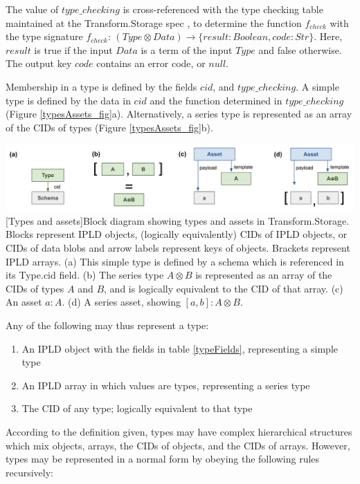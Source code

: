 \documentclass[9pt, oneside]{article}   	%
\begin{document}
The value of $type\_checking$ is cross-referenced with the type checking table maintained at the Transform.Storage spec \cite{transformSpec}, to determine the function $f_{check}$ with the type signature $f_{check}$: $(Type \otimes Data) \rightarrow \{result: Boolean, code: Str\}$. Here, $result$ is true if the input $Data$ is a term of the input $Type$ and false otherwise. The output key $code$ contains an error code, or $null$.

Membership in a type is defined by the fields $cid$, and $type\_checking$. A simple type is defined by the data in $cid$ and the function determined in $type\_checking$ (Figure \ref{typesAssets_fig}a). Alternatively, a series type is represented as an array of the CIDs of types (Figure \ref{typesAssets_fig}b). 


\begin{center}
\includegraphics[width=1\columnwidth]{fig_types_assets_20230802}
[Types and assets]{Block diagram showing types and assets in Transform.Storage. Blocks represent IPLD objects, (logically equivalently) CIDs of IPLD objects, or CIDs of data blobs and arrow labels represent keys of objects. Brackets represent IPLD arrays. (a) This simple type is defined by a schema which is referenced in its Type.cid field. (b) The series type $A \otimes B$ is represented as an array of the CIDs of types $A$ and $B$, and is logically equivalent to the CID of that array. (c) An asset $a : A$. (d) A series asset, showing $[a, b] : A \otimes B$.}
\label{typesAssets_fig}
\end{center}

Any of the following may thus represent a type:
\begin{enumerate}
\item An IPLD object with the fields in table \ref{typeFields}, representing a simple type
\item An IPLD array in which values are types, representing a series type
\item The CID of any type; logically equivalent to that type
\end{enumerate}


According to the definition given, types may have complex hierarchical structures which mix objects, arrays, the CIDs of objects, and the CIDs of arrays. However, types may be represented in a normal form by obeying the following rules recursively:
\end{document}
